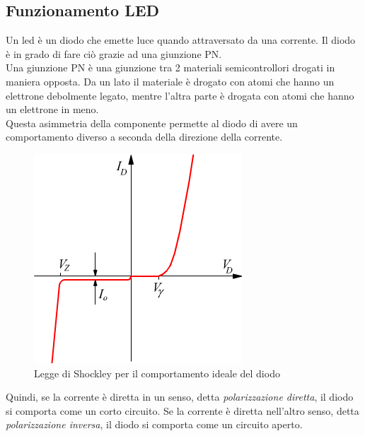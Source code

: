 \pagebreak
\subsection{Funzionamento LED}
Un led è un diodo che emette luce quando attraversato da una corrente. Il diodo è in grado di fare ciò grazie ad una giunzione PN.\\
Una giunzione PN è una giunzione tra 2 materiali semicontrollori drogati in maniera opposta. Da un lato il materiale è drogato con atomi che hanno un elettrone debolmente legato, mentre l'altra parte è drogata con atomi che hanno un elettrone in meno.\\
Questa asimmetria della componente permette al diodo di avere un comportamento diverso a seconda della direzione della corrente.\\ 
\begin{figure}
    \centering
    \includegraphics[width=\linewidth]{photomultiplier/assets/shokley.png}
    \caption{Legge di Shockley per il comportamento ideale del diodo}
    \label{fig:Photomultiplier}
\end{figure}

Quindi, se la corrente è diretta in un senso, detta \textit{polarizzazione diretta}, il diodo si comporta come un corto circuito. Se la corrente è diretta nell'altro senso, detta \textit{polarizzazione inversa}, il diodo si comporta come un circuito aperto.\\

